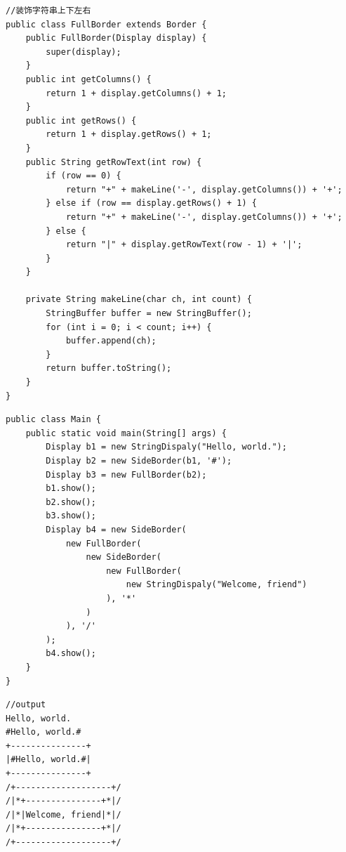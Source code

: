 \begin{lstlisting}
//装饰字符串上下左右
public class FullBorder extends Border {
	public FullBorder(Display display) {
		super(display);
	}
	public int getColumns() {
		return 1 + display.getColumns() + 1;
	}
	public int getRows() {
		return 1 + display.getRows() + 1;
	}
	public String getRowText(int row) {
		if (row == 0) {
			return "+" + makeLine('-', display.getColumns()) + '+';
		} else if (row == display.getRows() + 1) {
			return "+" + makeLine('-', display.getColumns()) + '+';
		} else {
			return "|" + display.getRowText(row - 1) + '|';
		}
	}
	
	private String makeLine(char ch, int count) {
		StringBuffer buffer = new StringBuffer();
		for (int i = 0; i < count; i++) {
			buffer.append(ch);
		}
		return buffer.toString();
	}
}
\end{lstlisting}
\begin{lstlisting}
public class Main {
	public static void main(String[] args) {
		Display b1 = new StringDispaly("Hello, world.");
		Display b2 = new SideBorder(b1, '#');
		Display b3 = new FullBorder(b2);
		b1.show();
		b2.show();
		b3.show();
		Display b4 = new SideBorder(
			new FullBorder(
				new SideBorder(
					new FullBorder(
						new StringDispaly("Welcome, friend")
					), '*'
				)
			), '/'
		);
		b4.show();
	}
}
\end{lstlisting}
\begin{lstlisting}
//output
Hello, world.
#Hello, world.#
+---------------+
|#Hello, world.#|
+---------------+
/+-------------------+/
/|*+---------------+*|/
/|*|Welcome, friend|*|/
/|*+---------------+*|/
/+-------------------+/
\end{lstlisting}
